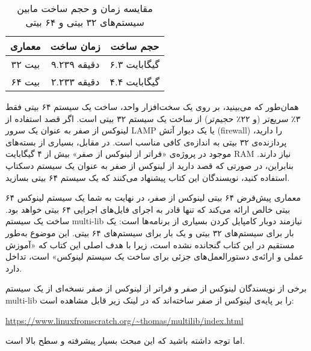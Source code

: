 \documentclass{book}
\begin{document}
\begin{table}[h]
	\centering
	\begin{tabular}{|c|c|c|}
		\hline
        معماری & زمان ساخت & حجم ساخت \\			
        		\hline
        ۳۲ بیت   & ۹.۲۳۹ دقیقه   & ۶.۳ گیگابایت   \\			
        ۶۴ بیت   & ۲.۲۳۳ دقیقه   & ۴.۴ گیگابایت   \\			
	        \hline
	\end{tabular}
	\caption{مقایسه زمان و حجم ساخت مابین سیستم‌های ۳۲ بیتی و ۶۴ بیتی}
\end{table}

همان‌طور که می‌بینید، بر روی یک سخت‌افزار واحد، ساخت یک سیستم ۶۴ بیتی فقط ۳٪ سریع‌تر (و ۲۲٪ حجیم‌تر) از ساخت یک سیستم ۳۲ بیتی است. اگر قصد استفاده از لینوکس از صفر به عنوان یک سرور LAMP یا یک دیوار آتش (firewall) را دارید، پردازنده‌ی ۳۲ بیتی به اندازه‌ی کافی مناسب است. در مقابل، بسیاری از بسته‌های موجود در پروژه‌ی «فراتر از لینوکس از صفر» بیش از ۴ گیگابایت RAM نیاز دارند. بنابراین، در صورتی که قصد دارید از لینوکس از صفر به عنوان یک سیستم دسکتاپ استفاده کنید، نویسندگان این کتاب پیشنهاد می‌کنند که یک سیستم ۶۴ بیتی بسازید.
\newline

\par
معماری پیش‌فرض ۶۴ بیتی لینوکس از صفر، در نهایت به شما یک سیستم لینوکس ۶۴ بیتی خالص ارائه می‌کند که تنها قادر به اجرای فایل‌های اجرایی ۶۴ بیتی خواهد بود. ساخت یک سیستم multi-lib نیازمند دوبار کامپایل کردن بسیاری از برنامه‌ها است: یک بار برای سیستم‌های ۳۲ بیتی و یک بار برای سیستم‌های ۶۴ بیتی. این موضوع به‌طور مستقیم در این کتاب گنجانده نشده است، زیرا با هدف اصلی این کتاب که «آموزش عملی و ارائه‌ی دستورالعمل‌های جزئی برای ساخت یک سیستم لینوکس» است، تداخل دارد.
\newline

\par
برخی از نویسندگان لینوکس از صفر و فراتر از لینوکس از صفر نسخه‌ای از یک سیستم multi-lib را بر پایه‌ی لینوکس از صفر ساخته‌اند که در لینک زیر قابل مشاهده است:

\begin{center}

	\url{https://www.linuxfromscratch.org/~thomas/multilib/index.html}
	
\end{center}

اما توجه داشته باشید که این مبحث بسیار پیشرفته و سطح بالا است.



\newpage
\end{document}
